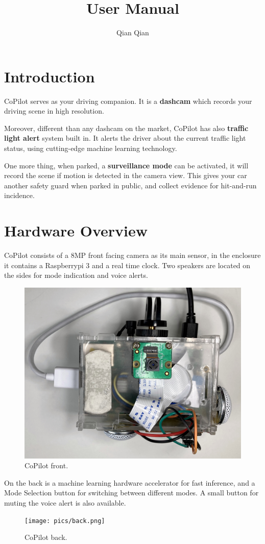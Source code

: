 \documentclass[a4paper]{manual}
\title{User Manual}
\author{Qian Qian}
\begin{document}
\maketitle

\tableofcontents
\newpage

\section{Introduction}
CoPilot serves as your driving companion. It is a \textbf{dashcam} which records your driving scene in high resolution. 

Moreover, different than any dashcam on the market, CoPilot has also \textbf{traffic light alert} system built in. It alerts the driver about the current traffic light status, using cutting-edge machine learning technology. 

One more thing, when parked, a \textbf{surveillance mode} can be activated, it will record the scene if motion is detected in the camera view. This gives your car another safety guard when parked in public, and collect evidence for hit-and-run incidence.

\section{Hardware Overview}
CoPilot consists of a 8MP front facing camera as its main sensor, in the enclosure it contains a Raspberrypi 3 and a real time clock. Two speakers are located on the sides for mode indication and voice alerts.
\begin{figure}[h!]
  \centering
  \includegraphics[width=.7\textwidth]{pics/front.jpg}
  \caption[]{CoPilot front.}
  \label{fig:front}
\end{figure}

On the back is a machine learning hardware accelerator for fast inference, and a Mode Selection button for switching between different modes. 
A small button for muting the voice alert is also available.
\begin{figure}[h!]
  \centering
  \texttt{[image: pics/back.png]}
  \caption[]{CoPilot back.}
  \label{fig:front}
\end{figure}
\end{document}
